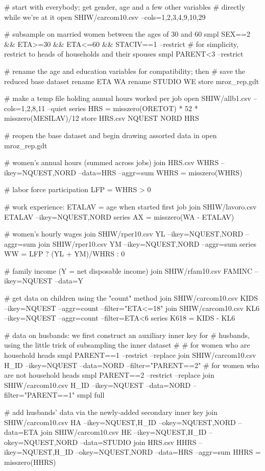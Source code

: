 \begin{code}
# start with everybody; get gender, age and a few other variables 
# directly while we're at it
open SHIW/carcom10.csv --cols=1,2,3,4,9,10,29

# subsample on married women between the ages of 30 and 60
smpl SEX==2 && ETA>=30 && ETA<=60 && STACIV==1 --restrict
# for simplicity, restrict to heads of households and their spouses
smpl PARENT<3  --restrict

# rename the age and education variables for compatibility; then
# save the reduced base dataset
rename ETA WA
rename STUDIO WE
store mroz_rep.gdt

# make a temp file holding annual hours worked per job
open SHIW/allb1.csv --cols=1,2,8,11 --quiet
series HRS = misszero(ORETOT) * 52 * misszero(MESILAV)/12
store HRS.csv NQUEST NORD HRS

# reopen the base dataset and begin drawing assorted data in
open mroz_rep.gdt

# women's annual hours (summed across jobs) 
join HRS.csv WHRS --ikey=NQUEST,NORD --data=HRS --aggr=sum
WHRS = misszero(WHRS)

# labor force participation
LFP = WHRS > 0

# work experience: ETALAV = age when started first job
join SHIW/lavoro.csv ETALAV --ikey=NQUEST,NORD
series AX = misszero(WA - ETALAV)

# women's hourly wages
join SHIW/rper10.csv YL --ikey=NQUEST,NORD --aggr=sum
join SHIW/rper10.csv YM --ikey=NQUEST,NORD --aggr=sum
series WW = LFP ? (YL + YM)/WHRS : 0

# family income (Y = net disposable income)
join SHIW/rfam10.csv FAMINC --ikey=NQUEST --data=Y

# get data on children using the "count" method
join SHIW/carcom10.csv KIDS --ikey=NQUEST --aggr=count --filter="ETA<=18"
join SHIW/carcom10.csv KL6 --ikey=NQUEST --aggr=count --filter=ETA<6
series K618 = KIDS - KL6

# data on husbands: we first construct an auxiliary inner key for 
# husbands, using the little trick of subsampling the inner dataset
#
# for women who are household heads
smpl PARENT==1 --restrict --replace
join SHIW/carcom10.csv H_ID --ikey=NQUEST --data=NORD --filter="PARENT==2"
# for women who are not household heads
smpl PARENT==2 --restrict --replace
join SHIW/carcom10.csv H_ID --ikey=NQUEST --data=NORD --filter="PARENT==1"
smpl full

# add husbands' data via the newly-added secondary inner key
join SHIW/carcom10.csv HA --ikey=NQUEST,H_ID --okey=NQUEST,NORD --data=ETA
join SHIW/carcom10.csv HE --ikey=NQUEST,H_ID --okey=NQUEST,NORD --data=STUDIO
join HRS.csv HHRS --ikey=NQUEST,H_ID --okey=NQUEST,NORD --data=HRS --aggr=sum
HHRS = misszero(HHRS)


\end{code}
